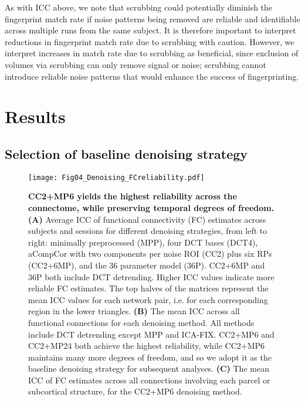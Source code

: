 \documentclass{article}
\begin{document}
As with ICC above, we note that scrubbing could potentially diminish the fingerprint match rate if noise patterns being removed are reliable and identifiable across multiple runs from the same subject.  It is therefore important to interpret reductions in fingerprint match rate due to scrubbing with caution. However, we interpret increases in match rate due to scrubbing as beneficial, since exclusion of volumes via scrubbing can only remove signal or noise; scrubbing cannot introduce reliable noise patterns that would enhance the success of fingerprinting.





\section{Results}
\label{sec:results}

\subsection{Selection of baseline denoising strategy}
\label{sec:baseline-denoising}

\begin{figure}
    \centering
    \texttt{[image: Fig04\_Denoising\_FCreliability.pdf]}
    \caption{\small \textbf{CC2+MP6 yields the highest reliability across the connectome, while preserving temporal degrees of freedom.} \textbf{(A)} Average ICC of functional connectivity (FC) estimates across subjects and sessions for different denoising strategies, from left to right: minimally preprocessed (MPP), four DCT bases (DCT4), aCompCor with two components per noise ROI (CC2) plus six RPs (CC2+6MP), and the 36 parameter model (36P). CC2+6MP and 36P both include DCT detrending. Higher ICC values indicate more reliable FC estimates. The top halves of the matrices represent the mean ICC values for each network pair, i.e. for each corresponding region in the lower triangles. \textbf{(B)} The mean ICC across all functional connections for each denoising method. All methods include DCT detrending except MPP and ICA-FIX. CC2+MP6 and CC2+MP24 both achieve the highest reliability, while CC2+MP6 maintains many more degrees of freedom, and so we adopt it as the baseline denoising strategy for subsequent analyses. \textbf{(C)} The mean ICC of FC estimates across all connections involving each parcel or subcortical structure, for the CC2+MP6 denoising method.}
    \label{fig:baselineICC}
\end{figure}
\end{document}
